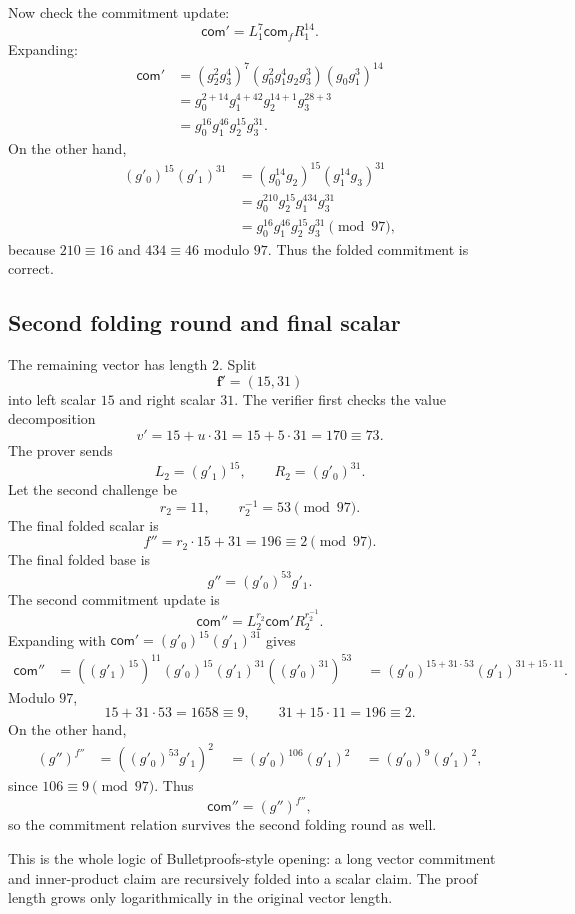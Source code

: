 Now check the commitment update:
\[
    \mathsf{com}'=L_1^{7}\mathsf{com}_fR_1^{14}.
\]
Expanding:
\[
\begin{aligned}
\mathsf{com}'
&=(g_2^2g_3^4)^7(g_0^2g_1^4g_2g_3^3)(g_0g_1^3)^{14}\\
&=g_0^{2+14}g_1^{4+42}g_2^{14+1}g_3^{28+3}\\
&=g_0^{16}g_1^{46}g_2^{15}g_3^{31}.
\end{aligned}
\]
On the other hand,
\[
\begin{aligned}
(g'_0)^{15}(g'_1)^{31}
&=(g_0^{14}g_2)^{15}(g_1^{14}g_3)^{31}\\
&=g_0^{210}g_2^{15}g_1^{434}g_3^{31}\\
&=g_0^{16}g_1^{46}g_2^{15}g_3^{31}\pmod{97},
\end{aligned}
\]
because $210\equiv16$ and $434\equiv46$ modulo $97$. Thus the folded commitment is correct.

\subsection{Second folding round and final scalar}

The remaining vector has length $2$. Split
\[
    \mathbf f'=(15,31)
\]
into left scalar $15$ and right scalar $31$. The verifier first checks the value decomposition
\[
    v'=15+u\cdot31=15+5\cdot31=170\equiv73.
\]
The prover sends
\[
    L_2=(g'_1)^{15},
    \qquad
    R_2=(g'_0)^{31}.
\]
Let the second challenge be
\[
    r_2=11,
    \qquad
    r_2^{-1}=53\pmod{97}.
\]
The final folded scalar is
\[
    f''=r_2\cdot15+31=196\equiv2\pmod{97}.
\]
The final folded base is
\[
    g''=(g'_0)^{53}g'_1.
\]
The second commitment update is
\[
    \mathsf{com}''=L_2^{r_2}\mathsf{com}'R_2^{r_2^{-1}}.
\]
Expanding with $\mathsf{com}'=(g'_0)^{15}(g'_1)^{31}$ gives
\[
\begin{aligned}
\mathsf{com}''
&=((g'_1)^{15})^{11}(g'_0)^{15}(g'_1)^{31}((g'_0)^{31})^{53}\
&=(g'_0)^{15+31\cdot 53}(g'_1)^{31+15\cdot 11}.
\end{aligned}
\]
Modulo $97$,
\[
    15+31\cdot53=1658\equiv 9,
    \qquad
    31+15\cdot11=196\equiv2.
\]
On the other hand,
\[
\begin{aligned}
(g'')^{f''}
&=((g'_0)^{53}g'_1)^2\
&=(g'_0)^{106}(g'_1)^2\
&=(g'_0)^9(g'_1)^2,
\end{aligned}
\]
since $106\equiv9\pmod{97}$. Thus
\[
    \mathsf{com}''=(g'')^{f''},
\]
so the commitment relation survives the second folding round as well.

This is the whole logic of Bulletproofs-style opening: a long vector commitment and inner-product claim are recursively folded into a scalar claim. The proof length grows only logarithmically in the original vector length.

